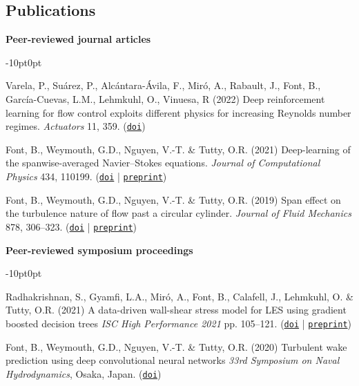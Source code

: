 \documentclass[line]{res}
\newenvironment{p}
  {\begin{adjustwidth}{-10pt}{0pt}}
  {\end{adjustwidth}}
\begin{document}
\begin{resume}
\section{Publications}
\vspace{0.25cm}
\hspace{-1cm}\textbf{Peer-reviewed journal articles}\vspace{0.25cm}
\begin{p}
\begin{etaremune}[leftmargin=-2pt,parsep=5pt]
\item Varela, P., Suárez, P., Alcántara-Ávila, F., Miró, A., Rabault, J., Font, B., García-Cuevas, L.M., Lehmkuhl, O., Vinuesa, R (2022) Deep reinforcement learning for flow control exploits different physics for increasing Reynolds number regimes. \textit{Actuators} 11, 359. (\href{https://doi.org/10.3390/act11120359}{\texttt{doi}})
\item Font, B., Weymouth, G.D., Nguyen, V.-T. \& Tutty, O.R. (2021) Deep-learning of the spanwise-averaged Navier--Stokes equations. \textit{Journal of Computational Physics} 434, 110199. (\href{https://doi.org/10.1016/j.jcp.2021.110199}{\texttt{doi}} | \href{https://arxiv.org/abs/2008.07528}{\texttt{preprint}})
\item Font, B., Weymouth, G.D., Nguyen, V.-T. \& Tutty, O.R. (2019) Span effect on the turbulence nature of flow past a circular cylinder. \textit{Journal of Fluid Mechanics} 878, 306--323. (\href{https://doi.org/10.1017/jfm.2019.637}{\texttt{doi}} | \href{https://arxiv.org/abs/2008.08933}{\texttt{preprint}})
\end{etaremune}
\end{p}

\hspace{-1cm}\textbf{Peer-reviewed symposium proceedings}\vspace{0.25cm}
\begin{p}
\begin{etaremune}[leftmargin=-2pt,parsep=5pt]
\item Radhakrishnan, S., Gyamfi, L.A., Mir\'{o}, A., Font, B., Calafell, J., Lehmkuhl, O. \& Tutty, O.R. (2021) A data-driven wall-shear stress model for LES using gradient boosted decision trees \textit{ISC High Performance 2021} pp. 105--121. (\href{https://doi.org/10.1007/978-3-030-90539-2_7}{\texttt{doi}} | \href{https://upcommons.upc.edu/bitstream/handle/2117/358666/Manuscript_isc2021.pdf?sequence=3}{\texttt{preprint}})
\item Font, B., Weymouth, G.D., Nguyen, V.-T. \& Tutty, O.R. (2020) Turbulent wake prediction using deep convolutional neural networks \textit{33rd Symposium on Naval Hydrodynamics}, Osaka, Japan. (\href{https://eprints.soton.ac.uk/444591/}{\texttt{doi}})
\end{etaremune}
\end{p}


\end{resume}
\end{document}
